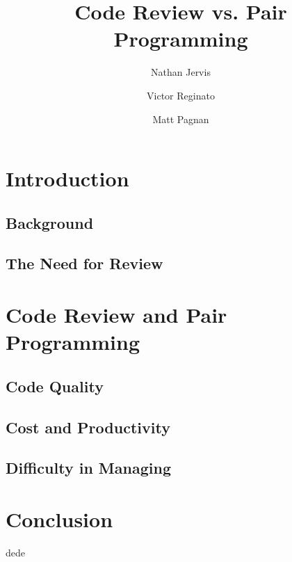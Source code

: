 \documentclass{article}
\title{Code Review vs. Pair Programming}
\author{Nathan Jervis \and Victor Reginato \and Matt Pagnan}
\begin{document}
\maketitle

\section{Introduction}

\subsection{Background}

\subsection{The Need for Review}

\section{Code Review and Pair Programming}

\subsection{Code Quality}

\subsection{Cost and Productivity}

\subsection{Difficulty in Managing}

\section{Conclusion}

dede
\end{document}
